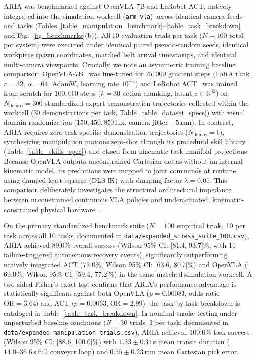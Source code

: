 \documentclass[journal]{IEEEtran}
\begin{document}
ARIA was benchmarked against OpenVLA-7B and LeRobot ACT, natively integrated into the simulation workcell (\texttt{arm\_vla}) across identical camera feeds and tasks (Tables~\ref{table_manipulation_benchmark}--\ref{table_task_breakdown} and Fig.~\ref{fig_benchmarks}(b)). All 10 evaluation trials per task ($N=100$ total per system) were executed under identical paired pseudo-random seeds, identical workpiece spawn coordinates, matched belt arrival timestamps, and identical multi-camera viewpoints. Crucially, we note an asymmetric training baseline comparison: OpenVLA-7B~\cite{kim2024openvla} was fine-tuned for $25{,}000$ gradient steps (LoRA rank $r=32$, $\alpha=64$, AdamW, learning rate $10^{-4}$) and LeRobot ACT~\cite{zhao2023learning} was trained from scratch for $100{,}000$ steps ($k=30$ action chunking, latent $z \in \mathbb{R}^{32}$) on $N_{\text{demos}} = 300$ standardized expert demonstration trajectories collected within the workcell ($30$ demonstrations per task, Table~\ref{table_dataset_specs}) with visual domain randomization ($150, 450, 850$\,lux, camera jitter $\pm 5$\,mm). In contrast, ARIA requires zero task-specific demonstration trajectories ($N_{\text{demos}} = 0$), synthesizing manipulation motions zero-shot through its procedural skill library (Table~\ref{table_skills_spec}) and closed-form kinematic task manifold projections. Because OpenVLA outputs unconstrained Cartesian deltas without an internal kinematic model, its predictions were mapped to joint commands at runtime using damped least-squares (DLS-IK) with damping factor $\lambda = 0.05$. This comparison deliberately investigates the structural architectural impedance between unconstrained continuous VLA policies and underactuated, kinematic-constrained physical hardware~\cite{kim2024openvla,aria_084_cadene_2026_lerobot}.

On the primary standardized benchmark suite ($N=100$ empirical trials, 10 per task across all 10 tasks, documented in \texttt{data/expanded\_stress\_suite\_100.csv}), ARIA achieved $89.0\%$ overall success (Wilson 95\% CI: [81.4, 93.7]\%, with 11 failure-triggered autonomous recovery events), significantly outperforming natively integrated ACT ($73.0\%$, Wilson 95\% CI: [63.6, 80.7]\%) and OpenVLA ($69.0\%$, Wilson 95\% CI: [59.4, 77.2]\%) in the same matched simulation workcell. A two-sided Fisher's exact test confirms that ARIA's performance advantage is statistically significant against both OpenVLA ($p = 0.00083$, odds ratio $\text{OR} = 3.64$) and ACT ($p = 0.0063$, $\text{OR} = 2.99$); the task-by-task breakdown is cataloged in Table~\ref{table_task_breakdown}. In nominal smoke testing under unperturbed baseline conditions ($N=30$ trials, 3 per task, documented in \texttt{data/expanded\_manipulation\_trials.csv}), ARIA achieved $100.0\%$ task success (Wilson 95\% CI: [88.6, 100.0]\%) with $1.33 \pm 0.31$\,s mean transit duration ($14.0\text{--}36.6$\,s full conveyor loop) and $0.55 \pm 0.23$\,mm mean Cartesian pick error.
\end{document}
